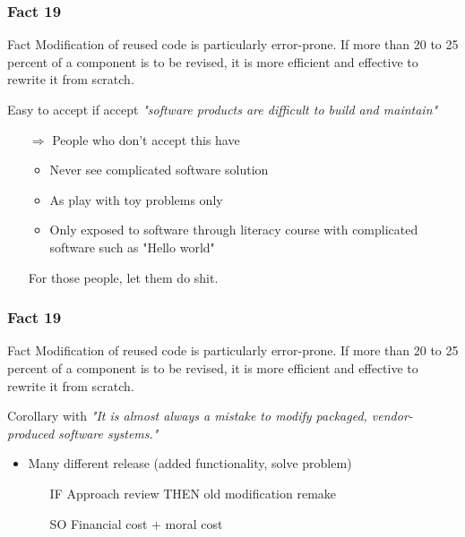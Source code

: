 \documentclass{beamer}
\begin{document}
\begin{frame}
    \frametitle{Fact 19}
    \begin{block}{Fact}
    Modification of reused code is particularly error-prone. If more than 20 to
    25 percent of a component is to be revised, it is more efficient and
    effective to rewrite it from scratch.
    \end{block}

    Easy to accept if accept \textit{"software products are difficult to
    build and maintain"}
    \begin{itemize}
        \item[$\Rightarrow$] People who don't accept this have
            \begin{itemize}
                \item Never see complicated software solution 
                \item As play with toy problems only
                \item Only exposed to software through literacy
                    course with complicated software such as 
                    "Hello world"
            \end{itemize}

            For those people, let them do shit.
    \end{itemize}

\end{frame}


\begin{frame}
    \frametitle{Fact 19}
    \begin{block}{Fact}
    Modification of reused code is particularly error-prone. If more than 20 to
    25 percent of a component is to be revised, it is more efficient and
    effective to rewrite it from scratch.
    \end{block}

    Corollary with \textit{"It is almost always a mistake to modify packaged,
    vendor-produced software systems."}

    \begin{itemize}
        \item Many different release (added functionality, solve problem)

            \begin{itemize}
                \item[\alert{IF}] Approach review \alert{THEN} old modification remake
                \item[\alert{SO}] Financial cost + moral cost
            \end{itemize}

    \end{itemize}
\end{frame}
\end{document}
